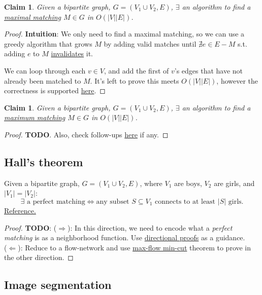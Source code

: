 \documentclass{article}
\newtheorem{claim}[theorem]{Claim}
\theoremstyle{definition}
\begin{document}
\begin{claim}
	Given a bipartite graph, $G = (V_1 \cup V_2, E)$, $\exists$ an algorithm to find a \hyperref[def:maximal_m]{maximal matching} $M \in G$ in $O(|V||E|)$.
\end{claim}

\begin{proof}
	\textbf{Intuition}: We only need to find a maximal matching, so we can use a greedy algorithm that grows $M$ by adding valid matches until $\nexists e \in E-M$ s.t. adding $e$ to $M$ \hyperref[def:match_edge]{invalidates} it.
	
	We can loop through each $v \in V$, and add the first of $v$'s edges that have not already been matched to $M$. It's left to prove this meets $O(|V||E|)$, however the correctness is supported \href{https://www.cs.dartmouth.edu/~ac/Teach/CS105-Winter05/Notes/kavathekar-scribe.pdf}{here}.
\end{proof}

\begin{claim}
	Given a bipartite graph, $G = (V_1 \cup V_2, E)$, $\exists$ an algorithm to find a \hyperref[def:maximum_m]{maximum matching} $M \in G$ in $O(|V||E|)$.
\end{claim}

\begin{proof}
	\textbf{TODO}. Also, check follow-ups \href{https://piazza.com/class/k52uzg6xjkl5xz?cid=705}{here} if any.
\end{proof}

\subsection{Hall's theorem}
Given a bipartite graph, $G = (V_1 \cup V_2, E)$, where $V_1$ are boys, $V_2$ are girls, and $|V_1|=|V_2|$:
$$\exists \text{ a perfect matching} \iff \text{any subset } S \subseteq V_1 \text{ connects to at least } |S| \text{ girls.}$$
\href{https://www2.cs.duke.edu/courses/spring19/compsci230/Notes/lecture14.pdf}{Reference.}

\begin{proof} 
\textbf{TODO}:
($\Rightarrow$): In this direction, we need to encode what a \textit{perfect matching} is as a neighborhood function. Use \href{http://www-cs-students.stanford.edu/~csilvers/proof/node4.html}{directional proofs} as a guidance.
\\($\Leftarrow$): Reduce to a flow-network and use \hyperref[thm:maxflowmincut]{max-flow min-cut} theorem to prove in the other direction.
\end{proof}

\subsection{Image segmentation}
\end{document}
